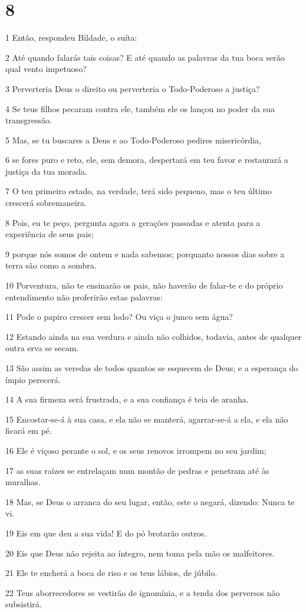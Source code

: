 \chapter{8}

\par 1 Então, respondeu Bildade, o suíta:
\par 2 Até quando falarás tais coisas? E até quando as palavras da tua boca serão qual vento impetuoso?
\par 3 Perverteria Deus o direito ou perverteria o Todo-Poderoso a justiça?
\par 4 Se teus filhos pecaram contra ele, também ele os lançou no poder da sua transgressão.
\par 5 Mas, se tu buscares a Deus e ao Todo-Poderoso pedires misericórdia,
\par 6 se fores puro e reto, ele, sem demora, despertará em teu favor e restaurará a justiça da tua morada.
\par 7 O teu primeiro estado, na verdade, terá sido pequeno, mas o teu último crescerá sobremaneira.
\par 8 Pois, eu te peço, pergunta agora a gerações passadas e atenta para a experiência de seus pais;
\par 9 porque nós somos de ontem e nada sabemos; porquanto nossos dias sobre a terra são como a sombra.
\par 10 Porventura, não te ensinarão os pais, não haverão de falar-te e do próprio entendimento não proferirão estas palavras:
\par 11 Pode o papiro crescer sem lodo? Ou viça o junco sem água?
\par 12 Estando ainda na sua verdura e ainda não colhidos, todavia, antes de qualquer outra erva se secam.
\par 13 São assim as veredas de todos quantos se esquecem de Deus; e a esperança do ímpio perecerá.
\par 14 A sua firmeza será frustrada, e a sua confiança é teia de aranha.
\par 15 Encostar-se-á à sua casa, e ela não se manterá, agarrar-se-á a ela, e ela não ficará em pé.
\par 16 Ele é viçoso perante o sol, e os seus renovos irrompem no seu jardim;
\par 17 as suas raízes se entrelaçam num montão de pedras e penetram até às muralhas.
\par 18 Mas, se Deus o arranca do seu lugar, então, este o negará, dizendo: Nunca te vi.
\par 19 Eis em que deu a sua vida! E do pó brotarão outros.
\par 20 Eis que Deus não rejeita ao íntegro, nem toma pela mão os malfeitores.
\par 21 Ele te encherá a boca de riso e os teus lábios, de júbilo.
\par 22 Teus aborrecedores se vestirão de ignomínia, e a tenda dos perversos não subsistirá.

